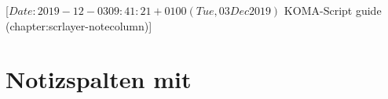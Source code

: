 %
%
%
%
%
%
%
%
% 
%
%
%
%

                 [$Date: 2019-12-03 09:41:21 +0100 (Tue, 03 Dec 2019) $
                  KOMA-Script guide (chapter:scrlayer-notecolumn)]

\chapter{Notizspalten mit }

